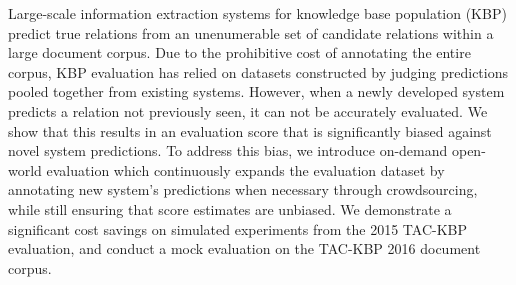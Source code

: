 Large-scale information extraction systems for knowledge base population (KBP) predict true relations from an unenumerable set of candidate relations within a large document corpus.
Due to the prohibitive cost of annotating the entire corpus, KBP evaluation has relied on datasets constructed by judging predictions pooled together from existing systems.
However, when a newly developed system predicts a relation not previously seen, it can not be accurately evaluated.
We show that this results in an evaluation score that is significantly biased against novel system predictions.
To address this bias,
  we introduce on-demand open-world evaluation which continuously expands the evaluation dataset by annotating new system's predictions when necessary through crowdsourcing, while still ensuring that score estimates are unbiased.
We demonstrate a significant cost savings on simulated experiments from the 2015 TAC-KBP evaluation, and conduct a mock evaluation on the TAC-KBP 2016 document corpus.

